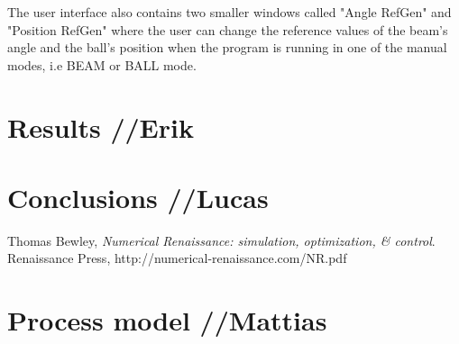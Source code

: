 \documentclass{article}
\begin{document}
The user interface also contains two smaller windows called "Angle RefGen" and "Position RefGen" where the user can change the reference values of the beam's angle and the ball's position when the program is running in one of the manual modes, i.e BEAM or BALL mode.
\section{Results //Erik}


\section{Conclusions //Lucas}


\clearpage
\begin{thebibliography}{9}
  Thomas Bewley,
  \emph{Numerical Renaissance: simulation, optimization, \& control}.
  Renaissance Press,
  http://numerical-renaissance.com/NR.pdf

\end{thebibliography}

\newpage
\appendix

\section{Process model //Mattias}\label{sec:model}

\end{document}

